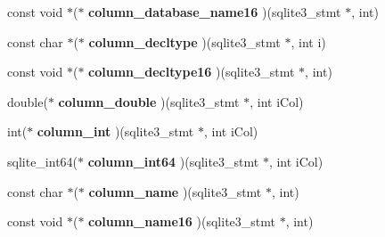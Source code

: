 \begin{DoxyCompactItemize}
\item 
\hypertarget{structsqlite3__api__routines_a707ef52cfe0e07ebddb86e078f9f0caf}{const void $\ast$($\ast$ {\bfseries column\-\_\-database\-\_\-name16} )(sqlite3\-\_\-stmt $\ast$, int)}\label{structsqlite3__api__routines_a707ef52cfe0e07ebddb86e078f9f0caf}

\item 
\hypertarget{structsqlite3__api__routines_afca592a63d3a249ddb0a042416237a5a}{const char $\ast$($\ast$ {\bfseries column\-\_\-decltype} )(sqlite3\-\_\-stmt $\ast$, int i)}\label{structsqlite3__api__routines_afca592a63d3a249ddb0a042416237a5a}

\item 
\hypertarget{structsqlite3__api__routines_a11d10f42586997006fd7ab07aaa365bf}{const void $\ast$($\ast$ {\bfseries column\-\_\-decltype16} )(sqlite3\-\_\-stmt $\ast$, int)}\label{structsqlite3__api__routines_a11d10f42586997006fd7ab07aaa365bf}

\item 
\hypertarget{structsqlite3__api__routines_afd21003df28cb46354c00599b90e6de5}{double($\ast$ {\bfseries column\-\_\-double} )(sqlite3\-\_\-stmt $\ast$, int i\-Col)}\label{structsqlite3__api__routines_afd21003df28cb46354c00599b90e6de5}

\item 
\hypertarget{structsqlite3__api__routines_a6211d95cf114f26cb48eed02d3b5eb70}{int($\ast$ {\bfseries column\-\_\-int} )(sqlite3\-\_\-stmt $\ast$, int i\-Col)}\label{structsqlite3__api__routines_a6211d95cf114f26cb48eed02d3b5eb70}

\item 
\hypertarget{structsqlite3__api__routines_a523a8d125fe83c9ea45eb4057a4d2458}{sqlite\-\_\-int64($\ast$ {\bfseries column\-\_\-int64} )(sqlite3\-\_\-stmt $\ast$, int i\-Col)}\label{structsqlite3__api__routines_a523a8d125fe83c9ea45eb4057a4d2458}

\item 
\hypertarget{structsqlite3__api__routines_a3bafa95a9ba845fa19408e9c3ac9aa69}{const char $\ast$($\ast$ {\bfseries column\-\_\-name} )(sqlite3\-\_\-stmt $\ast$, int)}\label{structsqlite3__api__routines_a3bafa95a9ba845fa19408e9c3ac9aa69}

\item 
\hypertarget{structsqlite3__api__routines_a1c7063d3e335648a8482fb1cdc46a627}{const void $\ast$($\ast$ {\bfseries column\-\_\-name16} )(sqlite3\-\_\-stmt $\ast$, int)}\label{structsqlite3__api__routines_a1c7063d3e335648a8482fb1cdc46a627}


\end{DoxyCompactItemize}
